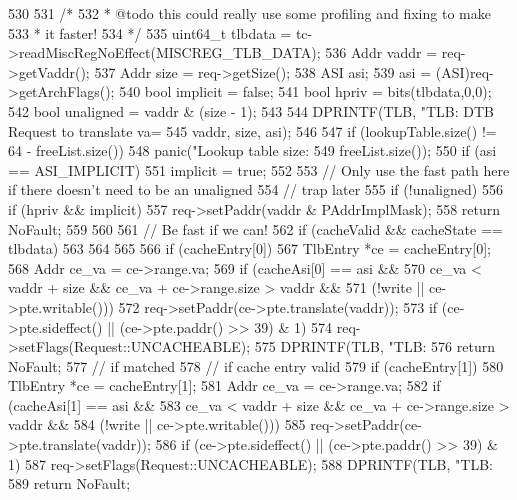 \begin{DoxyCode}
530 {
531     /*
532      * @todo this could really use some profiling and fixing to make
533      * it faster!
534      */
535     uint64_t tlbdata = tc->readMiscRegNoEffect(MISCREG_TLB_DATA);
536     Addr vaddr = req->getVaddr();
537     Addr size = req->getSize();
538     ASI asi;
539     asi = (ASI)req->getArchFlags();
540     bool implicit = false;
541     bool hpriv = bits(tlbdata,0,0);
542     bool unaligned = vaddr & (size - 1);
543 
544     DPRINTF(TLB, "TLB: DTB Request to translate va=%
545             vaddr, size, asi);
546 
547     if (lookupTable.size() != 64 - freeList.size())
548        panic("Lookup table size: %
549                freeList.size());
550     if (asi == ASI_IMPLICIT)
551         implicit = true;
552 
553     // Only use the fast path here if there doesn't need to be an unaligned
554     // trap later
555     if (!unaligned) {
556         if (hpriv && implicit) {
557             req->setPaddr(vaddr & PAddrImplMask);
558             return NoFault;
559         }
560 
561         // Be fast if we can!
562         if (cacheValid &&  cacheState == tlbdata) {
563 
564 
565 
566             if (cacheEntry[0]) {
567                 TlbEntry *ce = cacheEntry[0];
568                 Addr ce_va = ce->range.va;
569                 if (cacheAsi[0] == asi &&
570                     ce_va < vaddr + size && ce_va + ce->range.size > vaddr &&
571                     (!write || ce->pte.writable())) {
572                     req->setPaddr(ce->pte.translate(vaddr));
573                     if (ce->pte.sideffect() || (ce->pte.paddr() >> 39) & 1)
574                         req->setFlags(Request::UNCACHEABLE);
575                     DPRINTF(TLB, "TLB: %
576                     return NoFault;
577                 } // if matched
578             } // if cache entry valid
579             if (cacheEntry[1]) {
580                 TlbEntry *ce = cacheEntry[1];
581                 Addr ce_va = ce->range.va;
582                 if (cacheAsi[1] == asi &&
583                     ce_va < vaddr + size && ce_va + ce->range.size > vaddr &&
584                     (!write || ce->pte.writable())) {
585                     req->setPaddr(ce->pte.translate(vaddr));
586                     if (ce->pte.sideffect() || (ce->pte.paddr() >> 39) & 1)
587                         req->setFlags(Request::UNCACHEABLE);
588                     DPRINTF(TLB, "TLB: %
589                     return NoFault;
}}}}}
\end{DoxyCode}
